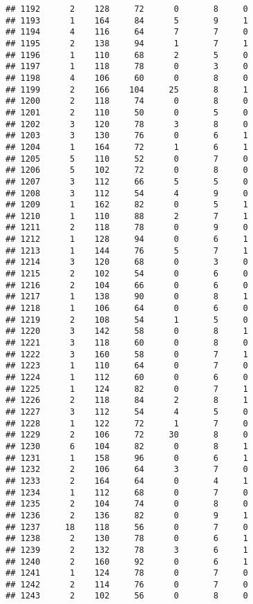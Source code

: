 \documentclass[
]{article}
\begin{document}
\begin{verbatim}
## 1192      2    128     72      0       8     0
## 1193      1    164     84      5       9     1
## 1194      4    116     64      7       7     0
## 1195      2    138     94      1       7     1
## 1196      1    110     68      2       5     0
## 1197      1    118     78      0       3     0
## 1198      4    106     60      0       8     0
## 1199      2    166    104     25       8     1
## 1200      2    118     74      0       8     0
## 1201      2    110     50      0       5     0
## 1202      3    120     78      3       8     0
## 1203      3    130     76      0       6     1
## 1204      1    164     72      1       6     1
## 1205      5    110     52      0       7     0
## 1206      5    102     72      0       8     0
## 1207      3    112     66      5       5     0
## 1208      3    112     54      4       9     0
## 1209      1    162     82      0       5     1
## 1210      1    110     88      2       7     1
## 1211      2    118     78      0       9     0
## 1212      1    128     94      0       6     1
## 1213      1    144     76      5       7     1
## 1214      3    120     68      0       3     0
## 1215      2    102     54      0       6     0
## 1216      2    104     66      0       6     0
## 1217      1    138     90      0       8     1
## 1218      1    106     64      0       6     0
## 1219      2    108     54      1       5     0
## 1220      3    142     58      0       8     1
## 1221      3    118     60      0       8     0
## 1222      3    160     58      0       7     1
## 1223      1    110     64      0       7     0
## 1224      1    112     60      0       6     0
## 1225      1    124     82      0       7     1
## 1226      2    118     84      2       8     1
## 1227      3    112     54      4       5     0
## 1228      1    122     72      1       7     0
## 1229      2    106     72     30       8     0
## 1230      6    104     82      0       8     1
## 1231      1    158     96      0       6     1
## 1232      2    106     64      3       7     0
## 1233      2    164     64      0       4     1
## 1234      1    112     68      0       7     0
## 1235      2    104     74      0       8     0
## 1236      2    136     82      0       9     1
## 1237     18    118     56      0       7     0
## 1238      2    130     78      0       6     1
## 1239      2    132     78      3       6     1
## 1240      2    160     92      0       6     1
## 1241      1    124     78      0       7     0
## 1242      2    114     76      0       7     0
## 1243      2    102     56      0       8     0

\end{verbatim}
\end{document}
